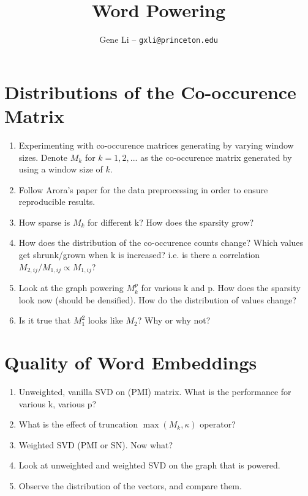 \documentclass[12pt]{article}
\title{Word Powering}
\author{Gene Li -- \texttt{gxli@princeton.edu}}
\begin{document}
\maketitle
\noindent

\section{Distributions of the Co-occurence Matrix}

\begin{enumerate}
\item Experimenting with co-occurence matrices generating by varying window sizes. Denote $M_k$ for $k= 1, 2, ...$ as the co-occurence matrix generated by using a window size of $k$.
\item Follow Arora's paper for the data preprocessing in order to ensure reproducible results.
\item How sparse is $M_k$ for different k? How does the sparsity grow?
\item How does the distribution of the co-occurence counts change? Which values get shrunk/grown when k is increased? i.e. is there a correlation $M_{2, ij}/M_{1, ij} \propto M_{1, ij}$?
\item Look at the graph powering $M_k^p$ for various k and p. How does the sparsity look now (should be densified). How do the distribution of values change?
\item Is it true that $M_1^2$ looks like $M_2$? Why or why not?
\end{enumerate}

\section{Quality of Word Embeddings}
\begin{enumerate}
\item Unweighted, vanilla SVD on (PMI) matrix. What is the performance for various k, various p?
\item What is the effect of truncation $\max(M_k, \kappa)$ operator?
\item Weighted SVD (PMI or SN). Now what?
\item Look at unweighted and weighted SVD on the graph that is powered. 
\item Observe the distribution of the vectors, and compare them.
\end{enumerate}
\end{document}
